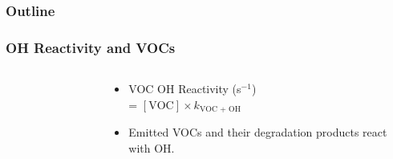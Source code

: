 \begin{frame}
    \frametitle{Outline} 
    \begin{flushleft}
        \tableofcontents[currentsection]
    \end{flushleft}
\end{frame} 

\begin{frame}
    \frametitle{OH Reactivity and VOCs}
    \vspace{-1cm}

    \begin{columns}[onlytextwidth]
        \begin{column}{0.45\textwidth}
            \begin{figure}
                \centering
                \def\svgwidth{\columnwidth}
                 
            \end{figure}
        \end{column}%
        \begin{column}{0.55\textwidth}
            \begin{center}
                \begin{itemize}
                    \item VOC OH Reactivity (s$^{-1}$) \\ \hspace{2mm}= $[\text{VOC}] \times k_{\text{VOC + OH}}$ \vspace{7mm}
                    \item Emitted VOCs and their degradation products react \\with OH. 
                \end{itemize}
            \end{center}
        \end{column}
    \end{columns}
\end{frame}

